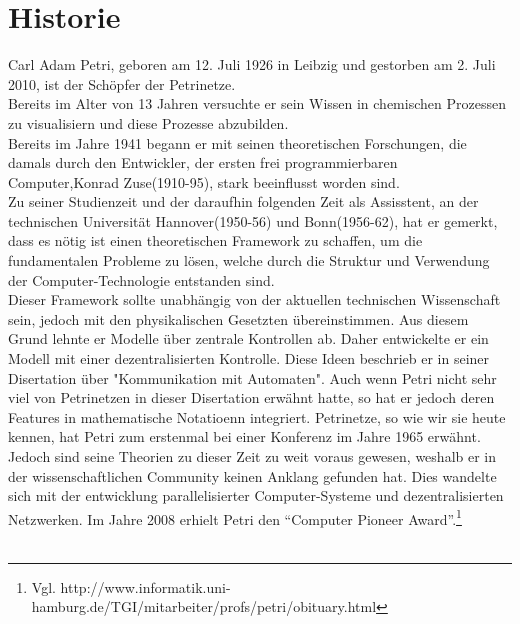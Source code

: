 \section{Historie}
Carl Adam Petri, geboren am 12. Juli 1926 in Leibzig und gestorben am 2. Juli 2010, ist der Schöpfer der Petrinetze. \\
Bereits im Alter von 13 Jahren versuchte er sein Wissen in chemischen Prozessen zu visualisiern und diese Prozesse abzubilden.\\ 
Bereits im Jahre 1941 begann er mit seinen theoretischen Forschungen, die damals durch den Entwickler, der ersten frei programmierbaren Computer,Konrad Zuse(1910-95), stark beeinflusst worden sind.\\
Zu seiner Studienzeit und der daraufhin folgenden Zeit als Assisstent, an der technischen Universität Hannover(1950-56) und Bonn(1956-62), hat er gemerkt, dass es nötig ist einen theoretischen Framework zu schaffen, um die fundamentalen Probleme zu lösen, welche durch die Struktur und Verwendung der Computer-Technologie entstanden sind. \\
Dieser Framework sollte unabhängig von der aktuellen technischen Wissenschaft sein, jedoch mit den physikalischen Gesetzten übereinstimmen.
Aus diesem Grund lehnte er Modelle über zentrale Kontrollen ab. Daher entwickelte er ein Modell mit einer dezentralisierten Kontrolle.
Diese Ideen beschrieb er in seiner Disertation über "Kommunikation mit Automaten".
Auch wenn Petri nicht sehr viel von Petrinetzen in dieser Disertation erwähnt hatte, so hat er jedoch deren Features in mathematische Notatioenn integriert.
Petrinetze, so wie wir sie heute kennen, hat Petri zum erstenmal bei einer Konferenz im Jahre 1965 erwähnt. \\ Jedoch sind seine Theorien zu dieser Zeit zu weit voraus gewesen, weshalb er in der wissenschaftlichen Community keinen Anklang gefunden hat. Dies wandelte sich mit der entwicklung parallelisierter Computer-Systeme und dezentralisierten Netzwerken. Im Jahre 2008 erhielt Petri den "`Computer Pioneer Award"'.\footnote{Vgl. http://www.informatik.uni-hamburg.de/TGI/mitarbeiter/profs/petri/obituary.html} \\ \\ 
